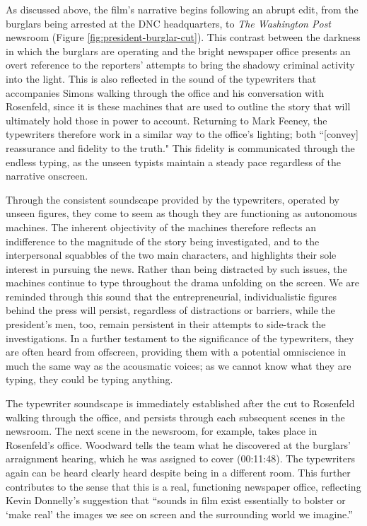 As discussed above, the film's narrative begins following an abrupt edit, from the burglars being arrested at the DNC headquarters, to \textit{The Washington Post} newsroom (Figure \ref{fig:president-burglar-cut}).
This contrast between the darkness in which the burglars are operating and the bright newspaper office presents an overt reference to the reporters' attempts to bring the shadowy criminal activity into the light.
This is also reflected in the sound of the typewriters that accompanies Simons walking through the office and his conversation with Rosenfeld, since it is these machines that are used to outline the story that will ultimately hold those in power to account.
Returning to Mark Feeney, the typewriters therefore work in a similar way to the office's lighting; both ``[convey] reassurance and fidelity to the truth."\autocites[][263]{feeney_nixon_2004}
This fidelity is communicated through the endless typing, as the unseen typists maintain a steady pace regardless of the narrative onscreen.

Through the consistent soundscape provided by the typewriters, operated by unseen figures, they come to seem as though they are functioning as autonomous machines.
The inherent objectivity of the machines therefore reflects an indifference to the magnitude of the story being investigated, and to the interpersonal squabbles of the two main characters, and highlights their sole interest in pursuing the news.
Rather than being distracted by such issues, the machines continue to type throughout the drama unfolding on the screen.
We are reminded through this sound that the entrepreneurial, individualistic figures behind the press will persist, regardless of distractions or barriers, while the president’s men, too, remain persistent in their attempts to side-track the investigations.
In a further testament to the significance of the typewriters, they are often heard from offscreen, providing them with a potential omniscience in much the same way as the acousmatic voices;
as we cannot know what they are typing, they could be typing anything.

The typewriter soundscape is immediately established after the cut to Rosenfeld walking through the office, and persists through each subsequent scenes in the newsroom.
The next scene in the newsroom, for example, takes place in Rosenfeld's office.
Woodward tells the team what he discovered at the burglars’ arraignment hearing, which he was assigned to cover (00:11:48).
The typewriters again can be heard clearly heard despite being in a different room.
This further contributes to the sense that this is a real, functioning newspaper office, reflecting Kevin Donnelly’s suggestion that ``sounds in film exist essentially to bolster or `make real’ the images we see on screen and the surrounding world we imagine.”\autocites[][108]{buckland_saw_2009}

